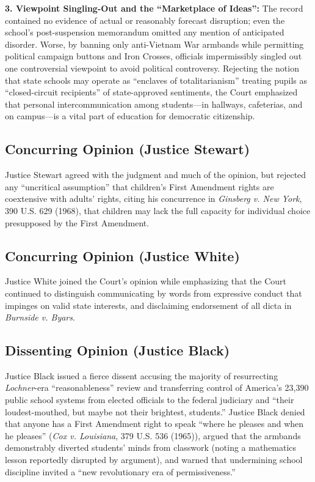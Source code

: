 \documentclass[12pt]{article}
\begin{document}
\textbf{3. Viewpoint Singling-Out and the ``Marketplace of Ideas'':} The record contained no evidence of actual or reasonably forecast disruption; even the school's post-suspension memorandum omitted any mention of anticipated disorder. Worse, by banning only anti-Vietnam War armbands while permitting political campaign buttons and Iron Crosses, officials impermissibly singled out one controversial viewpoint to avoid political controversy. Rejecting the notion that state schools may operate as ``enclaves of totalitarianism'' treating pupils as ``closed-circuit recipients'' of state-approved sentiments, the Court emphasized that personal intercommunication among students---in hallways, cafeterias, and on campus---is a vital part of education for democratic citizenship.

\subsection{Concurring Opinion (Justice Stewart)}

Justice Stewart agreed with the judgment and much of the opinion, but rejected any ``uncritical assumption'' that children's First Amendment rights are coextensive with adults' rights, citing his concurrence in \textit{Ginsberg v. New York}, 390 U.S. 629 (1968), that children may lack the full capacity for individual choice presupposed by the First Amendment.

\subsection{Concurring Opinion (Justice White)}

Justice White joined the Court's opinion while emphasizing that the Court continued to distinguish communicating by words from expressive conduct that impinges on valid state interests, and disclaiming endorsement of all dicta in \textit{Burnside v. Byars}.

\subsection{Dissenting Opinion (Justice Black)}

Justice Black issued a fierce dissent accusing the majority of resurrecting \textit{Lochner}-era ``reasonableness'' review and transferring control of America's 23,390 public school systems from elected officials to the federal judiciary and ``their loudest-mouthed, but maybe not their brightest, students.'' Justice Black denied that anyone has a First Amendment right to speak ``where he pleases and when he pleases'' (\textit{Cox v. Louisiana}, 379 U.S. 536 (1965)), argued that the armbands demonstrably diverted students' minds from classwork (noting a mathematics lesson reportedly disrupted by argument), and warned that undermining school discipline invited a ``new revolutionary era of permissiveness.''
\end{document}
